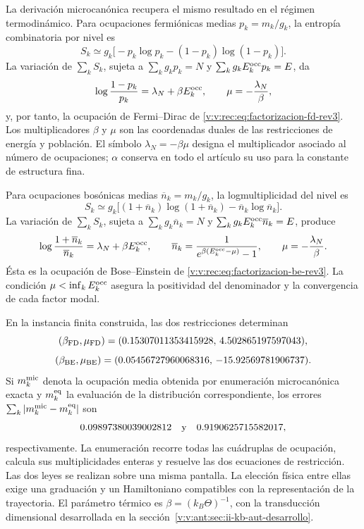La derivación microcanónica recupera el mismo resultado en el régimen
termodinámico. Para ocupaciones fermiónicas medias
\(p_k=m_k/g_k\), la entropía combinatoria por nivel es
\begin{equation}
 S_k\simeq
 g_k\bigl[-p_k\log p_k-(1-p_k)\log(1-p_k)\bigr].
 \label{v:v:rec:eq:entropia-fd-nivel-rev3}
\end{equation}
La variación de \(\sum_kS_k\), sujeta a
\(\sum_kg_kp_k=N\) y
\(\sum_kg_kE_k^{\rm occ}p_k=E\), da
\begin{equation}
 \log\frac{1-p_k}{p_k}=\lambda_N+\beta E_k^{\rm occ},
 \qquad
 \mu=-\frac{\lambda_N}{\beta},
 \label{v:v:rec:eq:variacion-fd-rev3}
\end{equation}
y, por tanto, la ocupación de Fermi--Dirac de
\eqref{v:v:rec:eq:factorizacion-fd-rev3}. Los multiplicadores \(\beta\) y \(\mu\)
son las coordenadas duales de las restricciones de energía y población.
El símbolo \(\lambda_N=-\beta\mu\) designa el multiplicador asociado al
número de ocupaciones; \(\alpha\) conserva en todo el artículo su uso
para la constante de estructura fina.

Para ocupaciones bosónicas medias
\(\overline n_k=m_k/g_k\), la logmultiplicidad del nivel es
\begin{equation}
 S_k\simeq
 g_k\bigl[(1+\overline n_k)\log(1+\overline n_k)
          -\overline n_k\log\overline n_k\bigr].
 \label{v:v:rec:eq:entropia-be-nivel-rev3}
\end{equation}
La variación de \(\sum_kS_k\), sujeta a
\(\sum_kg_k\overline n_k=N\) y
\(\sum_kg_kE_k^{\rm occ}\overline n_k=E\), produce
\begin{equation}
 \log\frac{1+\overline n_k}{\overline n_k}
 =\lambda_N+\beta E_k^{\rm occ},
 \qquad
 \overline n_k
 =\frac{1}{e^{\beta(E_k^{\rm occ}-\mu)}-1},
 \qquad
 \mu=-\frac{\lambda_N}{\beta}.
 \label{v:v:rec:eq:variacion-be-rev3}
\end{equation}
Ésta es la ocupación de Bose--Einstein de
\eqref{v:v:rec:eq:factorizacion-be-rev3}. La condición
\(\mu<\inf_kE_k^{\rm occ}\) asegura la positividad del denominador y la
convergencia de cada factor modal.

En la instancia finita construida, las dos restricciones determinan
\[
 (\beta_{\rm FD},\mu_{\rm FD})
 =(0.15307011353415928,\,4.502865197597043),
\]
\[
 (\beta_{\rm BE},\mu_{\rm BE})
 =(0.05456727960068316,\,-15.92569781906737).
\]
Si \(m_k^{\rm mic}\) denota la ocupación media obtenida por enumeración
microcanónica exacta y \(m_k^{\rm eq}\) la evaluación de la distribución
correspondiente, los errores
\(\sum_k|m_k^{\rm mic}-m_k^{\rm eq}|\) son
\[
 0.09897380039002812\quad\hbox{y}\quad
 0.9190625715582017,
\]
respectivamente. La enumeración recorre todas las cuádruplas de ocupación,
calcula sus multiplicidades enteras y resuelve las dos ecuaciones de
restricción. Las dos leyes se realizan sobre una misma pantalla. La elección
física entre ellas exige una graduación y un Hamiltoniano compatibles con la
representación de la trayectoria. El parámetro térmico es
\(\beta=(k_B\Theta)^{-1}\), con la transducción dimensional desarrollada en
la sección~\ref{v:v:ant:sec:ii-kb-aut-desarrollo}.

